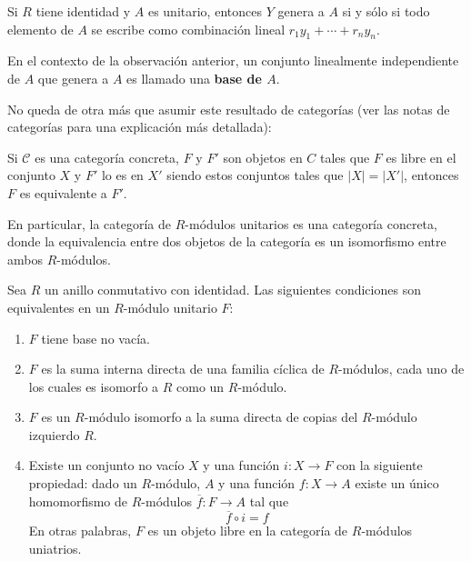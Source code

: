 \documentclass[12pt]{report}
\newcounter{it}
\theoremstyle{largebreak}
\newcommand\abs[1]{\ensuremath{\big|#1\big|}}
\newcommand\cf[3]{\ensuremath{#1:#2\rightarrow#3}}
\begin{document}
    \begin{obs}
        Si $R$ tiene identidad y $A$ es unitario, entonces $Y$ genera a $A$ si y sólo si todo elemento de $A$ se escribe como combinación lineal $r_1y_1+\cdots+r_ny_n$.
    \end{obs}

    \begin{mydef}
        En el contexto de la observación anterior, un conjunto linealmente independiente de $A$ que genera a $A$ es llamado una \textbf{base de $A$}.
    \end{mydef}

    No queda de otra más que asumir este resultado de categorías (ver las notas de categorías para una explicación más detallada):

    \begin{theor}
        Si $\mathcal{C}$ es una categoría concreta, $F$ y $F'$ son objetos en $C$ tales que $F$ es libre en el conjunto $X$ y $F'$ lo es en $X'$ siendo estos conjuntos tales que $\abs{X}=\abs{X'}$, entonces $F$ es equivalente a $F'$.
    \end{theor}

    En particular, la categoría de $R$-módulos unitarios es una categoría concreta, donde la equivalencia entre dos objetos de la categoría es un isomorfismo entre ambos $R$-módulos.

    \begin{theor}
        Sea $R$ un anillo conmutativo con identidad. Las siguientes condiciones son equivalentes en un $R$-módulo unitario $F$:
        \renewcommand{\theenumi}{\roman{enumi}}
        \begin{enumerate}
            \item $F$ tiene base no vacía.
            \item $F$ es la suma interna directa de una familia cíclica de $R$-módulos, cada uno de los cuales es isomorfo a $R$ como un $R$-módulo.
            \item $F$ es un $R$-módulo isomorfo a la suma directa de copias del $R$-módulo izquierdo $R$.
            \item Existe un conjunto no vacío $X$ y una función $\cf{i}{X}{F}$ con la siguiente propiedad: dado un $R$-módulo, $A$ y una función $\cf{f}{X}{A}$ existe un único homomorfismo de $R$-módulos $\cf{\overline{f}}{F}{A}$ tal que
            \begin{equation*}
                \overline{f}\circ i=f
            \end{equation*}
            En otras palabras, $F$ es un objeto libre en la categoría de $R$-módulos uniatrios.
        \end{enumerate}
    \end{theor}
\end{document}
